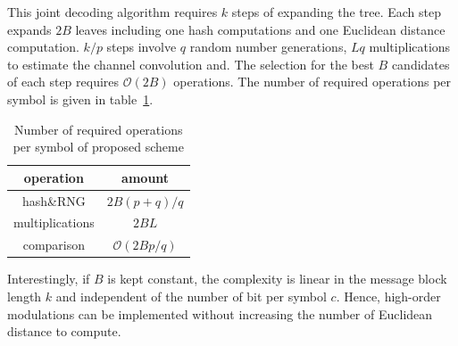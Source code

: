 \documentclass[conference]{IEEEtran}
\begin{document}
This joint decoding algorithm requires $k$ steps of expanding the tree. Each step expands $2B$ leaves including one hash computations and one Euclidean distance computation. $k/p$ steps involve $q$ random number generations, $Lq$ multiplications to estimate the channel convolution and. The selection for the best $B$ candidates of each step requires $\mathcal{O}(2B)$ operations. The number of required operations per symbol is given in table~\ref{tab_ComplexitySpinal}. 

\begin{table}[!t]
\renewcommand{\arraystretch}{1.3}
\centering
\caption{Number of required operations per symbol of proposed scheme}
\label{tab_ComplexitySpinal}
\begin{tabular}{|c||c|}
\hline
\textbf{operation} &\textbf{amount} \\
\hline
hash\&RNG  & $2B(p+q)/q$\\
\hline
multiplications& $2BL$\\
\hline
comparison & $\mathcal{O}(2Bp/q)$\\
\hline

\end{tabular}

\end{table}

Interestingly, if $B$ is kept constant, the complexity is linear in the message block length $k$ and independent of the number of bit per symbol $c$. Hence, high-order modulations can be implemented without increasing the number of Euclidean distance to compute. 
\end{document}
